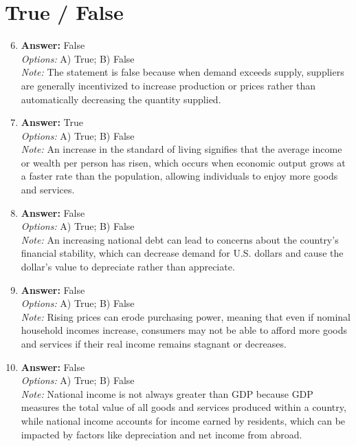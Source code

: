 \documentclass[12pt]{article}
\begin{document}
\section*{True / False}
\begin{enumerate}[label=\arabic*.]
\setcounter{enumi}{5}
\item \textbf{Answer:} False
\\ \textit{Options:} A) True; B) False
\\ \textit{Note:} The statement is false because when demand exceeds supply, suppliers are generally incentivized to increase production or prices rather than automatically decreasing the quantity supplied.
\item \textbf{Answer:} True
\\ \textit{Options:} A) True; B) False
\\ \textit{Note:} An increase in the standard of living signifies that the average income or wealth per person has risen, which occurs when economic output grows at a faster rate than the population, allowing individuals to enjoy more goods and services.
\item \textbf{Answer:} False
\\ \textit{Options:} A) True; B) False
\\ \textit{Note:} An increasing national debt can lead to concerns about the country's financial stability, which can decrease demand for U.S. dollars and cause the dollar's value to depreciate rather than appreciate.
\item \textbf{Answer:} False
\\ \textit{Options:} A) True; B) False
\\ \textit{Note:} Rising prices can erode purchasing power, meaning that even if nominal household incomes increase, consumers may not be able to afford more goods and services if their real income remains stagnant or decreases.
\item \textbf{Answer:} False
\\ \textit{Options:} A) True; B) False
\\ \textit{Note:} National income is not always greater than GDP because GDP measures the total value of all goods and services produced within a country, while national income accounts for income earned by residents, which can be impacted by factors like depreciation and net income from abroad.
\end{enumerate}
\end{document}
